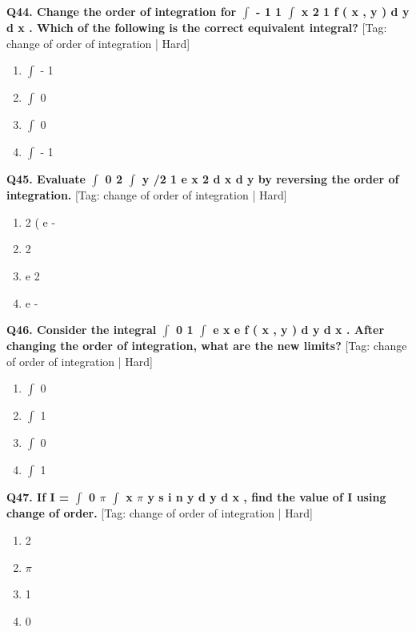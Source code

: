 \noindent\textbf{Q44. Change the order of integration for $\int$ - 1 1 $\int$ x 2 1 f ( x , y ) d y d x . Which of the following is the correct equivalent integral?} \hfill [Tag: change of order of integration | Hard]
\begin{enumerate}[label=(\alph*),topsep=2pt,itemsep=1pt,partopsep=0pt,parsep=0pt]
    \item {{$\int$ - 1}}
    \item {{$\int$ 0}}
    \item {{$\int$ 0}}
    \item {{$\int$ - 1}}
\end{enumerate}
\vspace{2mm}

\noindent\textbf{Q45. Evaluate $\int$ 0 2 $\int$ y /2 1 e x 2 d x d y by reversing the order of integration.} \hfill [Tag: change of order of integration | Hard]
\begin{enumerate}[label=(\alph*),topsep=2pt,itemsep=1pt,partopsep=0pt,parsep=0pt]
    \item {{2 ( e -}}
    \item {{2}}
    \item {{e 2}}
    \item {{e -}}
\end{enumerate}
\vspace{2mm}

\noindent\textbf{Q46. Consider the integral $\int$ 0 1 $\int$ e x e f ( x , y ) d y d x . After changing the order of integration, what are the new limits?} \hfill [Tag: change of order of integration | Hard]
\begin{enumerate}[label=(\alph*),topsep=2pt,itemsep=1pt,partopsep=0pt,parsep=0pt]
    \item {{$\int$ 0}}
    \item {{$\int$ 1}}
    \item {{$\int$ 0}}
    \item {{$\int$ 1}}
\end{enumerate}
\vspace{2mm}

\noindent\textbf{Q47. If I = $\int$ 0 $\pi$ $\int$ x $\pi$ y s i n y d y d x , find the value of I using change of order.} \hfill [Tag: change of order of integration | Hard]
\begin{enumerate}[label=(\alph*),topsep=2pt,itemsep=1pt,partopsep=0pt,parsep=0pt]
    \item {{2}}
    \item {{$\pi$}}
    \item {{1}}
    \item {{0}}
\end{enumerate}
\vspace{2mm}

